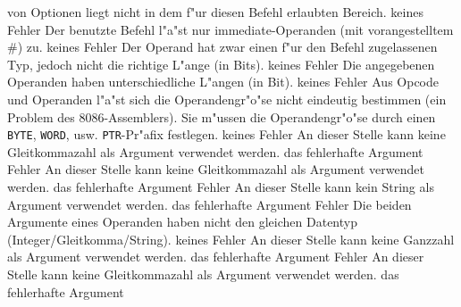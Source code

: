 \documentclass[12pt,a4paper,twoside]{report}
\newcommand{\tty}[1]{{\tt #1}}
\begin{document}
\begin{description}
{	        von Optionen liegt nicht in dem f"ur diesen
                Befehl erlaubten Bereich.}
               {keines}
               {Fehler}
               {Der benutzte Befehl l"a"st nur
                immediate-Operanden (mit vorangestelltem \#) zu.}
               {keines}
               {Fehler}
               {Der Operand hat zwar einen f"ur den Befehl
                zugelassenen Typ, jedoch nicht die richtige L"ange (in
                Bits).}
               {keines}
               {Fehler}
               {Die angegebenen Operanden haben unterschiedliche
                L"angen (in Bit).}
               {keines}
               {Fehler}
               {Aus Opcode und Operanden l"a"st sich die
                Operandengr"o"se nicht eindeutig bestimmen (ein Problem
                des 8086-Assemblers).  Sie m"ussen die Operandengr"o"se
                durch einen \tty{BYTE}, \tty{WORD}, usw. \tty{PTR}-Pr"afix
	        festlegen.}
               {keines}
               {Fehler}
               {An dieser Stelle kann keine Gleitkommazahl als Argument
                verwendet werden.}
               {das fehlerhafte Argument}
               {Fehler}
               {An dieser Stelle kann keine Gleitkommazahl als Argument
                verwendet werden.}
               {das fehlerhafte Argument}
               {Fehler}
               {An dieser Stelle kann kein String als Argument
                verwendet werden.}
               {das fehlerhafte Argument}
               {Fehler}
               {Die beiden Argumente eines Operanden haben nicht
                den gleichen Datentyp (Integer/Gleitkomma/String).}
               {keines}
               {Fehler}
               {An dieser Stelle kann keine Ganzzahl als Argument
                verwendet werden.}
               {das fehlerhafte Argument}
               {Fehler}
               {An dieser Stelle kann keine Gleitkommazahl als Argument
                verwendet werden.}
               {das fehlerhafte Argument}

\end{description}
\end{document}
